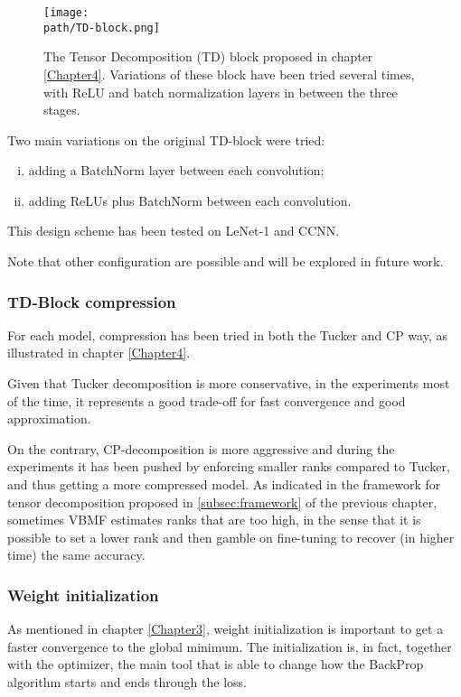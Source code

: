  \begin{figure}[h!]
 \centering
 \texttt{[image: \\path/TD-block.png]} 
 \caption{The Tensor Decomposition (TD) block proposed in chapter \ref{Chapter4}. Variations of these block have been tried several times, with ReLU and batch normalization layers in between the three stages.}
 \label{fig:bigdata}
\end{figure}

Two main variations on the original TD-block were tried: 
\begin{enumerate}[(i)]
    \item adding a BatchNorm layer between each convolution; 
    
    \item adding ReLUs plus BatchNorm between each convolution. 
\end{enumerate}

This design scheme has been tested on LeNet-1 and CCNN. 

Note that other configuration are possible and will be explored in future work. 

\subsubsection{TD-Block compression}
For each model, compression has been tried in both the Tucker and CP way, as illustrated in chapter \ref{Chapter4}. 

Given that Tucker decomposition is more conservative, in the experiments most of the time, it represents a good trade-off for fast convergence and good approximation. 
\newline 

On the contrary, CP-decomposition is more aggressive and during the experiments it has been pushed by enforcing smaller ranks compared to Tucker, and thus getting a more compressed model. As indicated in the framework for tensor decomposition proposed in \ref{subsec:framework} of the previous chapter, sometimes VBMF estimates ranks that are too high, in the sense that it is possible to set a lower rank and then gamble on fine-tuning to recover (in higher time) the same accuracy.  

\subsubsection{Weight initialization}
As mentioned in chapter \ref{Chapter3}, weight initialization is important to get a faster convergence to the global minimum. The initialization is, in fact, together with the optimizer, the main tool that is able to change how the BackProp algorithm starts and ends through the loss.


